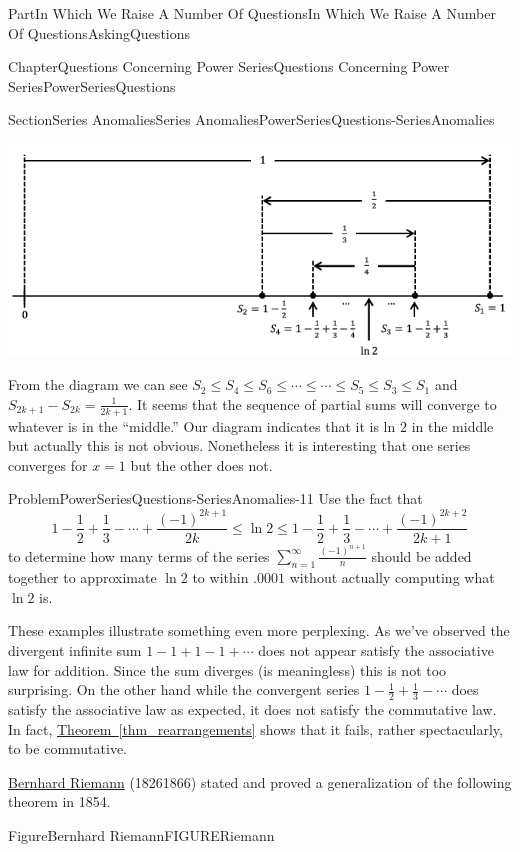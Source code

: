 \documentclass[oneside,10pt,]{book}
\newcommand{\xreffont}{\relax}
\numberwithin{equation}{part}
\begin{document}
\begin{partptx}{Part}{In Which We Raise A Number Of Questions}{}{In Which We Raise A Number Of Questions}{}{}{AskingQuestions}
\begin{chapterptx}{Chapter}{Questions Concerning Power Series}{}{Questions Concerning Power Series}{}{}{PowerSeriesQuestions}
\begin{sectionptx}{Section}{Series Anomalies}{}{Series Anomalies}{}{}{PowerSeriesQuestions-SeriesAnomalies}
\begin{image}{0.05}{0.9}{0.05}{}
\includegraphics[width=\linewidth]{external/images/AltHarmonic.png}
\end{image}%
From the diagram we can see \(S_2\leq S_4\leq S_6\leq\cdots\leq\cdots\leq S_5\leq S_3\leq S_1\) and \(S_{2k+1}-S_{2k}=\frac{1}{2k+1}\). It seems that the sequence of partial sums will converge to whatever is in the ``middle.'' Our diagram indicates that it is ln \(2\) in the middle but actually this is not obvious. Nonetheless it is interesting that one series converges for \(x=1\) but the other does not.%
\begin{problem}{Problem}{}{PowerSeriesQuestions-SeriesAnomalies-11}%
 Use the fact that%
\begin{equation*}
1-\frac{1}{2}+\frac{1}{3}-\cdots+\frac{(-1)^{2k+1}}{2k}\leq\ln 2\leq 1-\frac{1}{2}+\frac{1}{3}-\cdots+\frac{(-1)^{2k+2}}{2k+1}
\end{equation*}
to determine how many terms of the series \(\sum_{n=1}^\infty\frac{(-1)^{n+1}}{n}\) should be added together to approximate \(\ln 2\) to within \(.0001\) without actually computing what \(\ln 2\) is.%
\end{problem}
These examples illustrate something even more perplexing.  As we've observed the divergent infinite sum \(1-1+1-1+\cdots\) does not appear satisfy the associative law for addition. Since the sum diverges (is meaningless) this is not too surprising.  On the other hand while the convergent series \(1-\frac{1}{2}+\frac{1}{3}-\cdots\) does satisfy the associative law as expected, it does not satisfy the commutative law.  In fact, \hyperref[thm_rearrangements]{Theorem~{\xreffont\ref{thm_rearrangements}}} shows that it fails,  rather spectacularly, to be commutative.%
\par
{} \href{https://mathshistory.st-andrews.ac.uk/Biographies/Riemann/}{Bernhard Riemann} (1826\textendash{}1866) stated and proved a generalization of the following theorem in 1854.%
\begin{figureptx}{Figure}{Bernhard Riemann}{FIGURERiemann}{}%

\end{figureptx}
\end{sectionptx}
\end{chapterptx}
\end{partptx}
\end{document}
